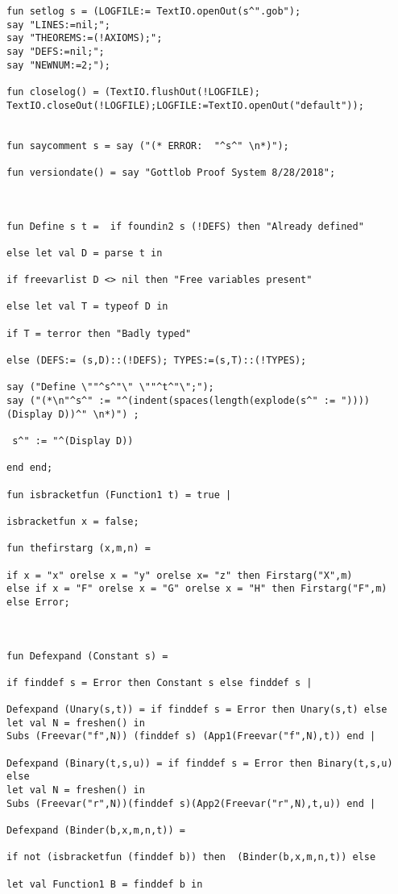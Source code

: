 \documentclass{article}
\begin{document}
{{\begin{verbatim}
fun setlog s = (LOGFILE:= TextIO.openOut(s^".gob");
say "LINES:=nil;";
say "THEOREMS:=(!AXIOMS);";
say "DEFS:=nil;";
say "NEWNUM:=2;");

fun closelog() = (TextIO.flushOut(!LOGFILE);
TextIO.closeOut(!LOGFILE);LOGFILE:=TextIO.openOut("default"));


fun saycomment s = say ("(* ERROR:  "^s^" \n*)");

fun versiondate() = say "Gottlob Proof System 8/28/2018";



fun Define s t =  if foundin2 s (!DEFS) then "Already defined"

else let val D = parse t in

if freevarlist D <> nil then "Free variables present"

else let val T = typeof D in

if T = terror then "Badly typed"

else (DEFS:= (s,D)::(!DEFS); TYPES:=(s,T)::(!TYPES);

say ("Define \""^s^"\" \""^t^"\";");
say ("(*\n"^s^" := "^(indent(spaces(length(explode(s^" := ")))) (Display D))^" \n*)") ;

 s^" := "^(Display D))

end end;

fun isbracketfun (Function1 t) = true |

isbracketfun x = false;

fun thefirstarg (x,m,n) =

if x = "x" orelse x = "y" orelse x= "z" then Firstarg("X",m) 
else if x = "F" orelse x = "G" orelse x = "H" then Firstarg("F",m)
else Error;



fun Defexpand (Constant s) =

if finddef s = Error then Constant s else finddef s |

Defexpand (Unary(s,t)) = if finddef s = Error then Unary(s,t) else
let val N = freshen() in
Subs (Freevar("f",N)) (finddef s) (App1(Freevar("f",N),t)) end |

Defexpand (Binary(t,s,u)) = if finddef s = Error then Binary(t,s,u) else
let val N = freshen() in
Subs (Freevar("r",N))(finddef s)(App2(Freevar("r",N),t,u)) end |

Defexpand (Binder(b,x,m,n,t)) =

if not (isbracketfun (finddef b)) then  (Binder(b,x,m,n,t)) else

let val Function1 B = finddef b in


\end{verbatim}}}
\end{document}
